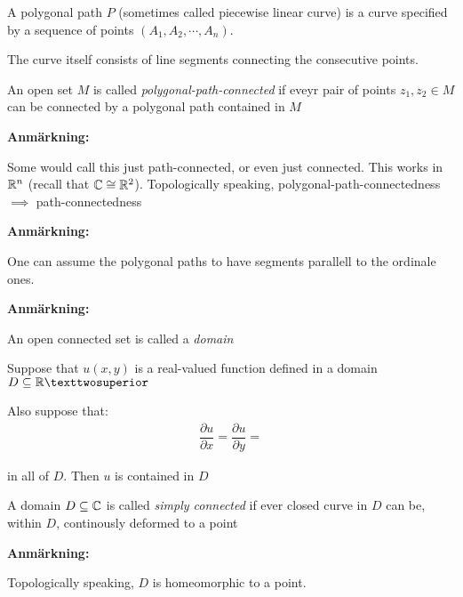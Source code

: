 \par\bigskip
\begin{theo}{}
  A polygonal path $P$ (sometimes called piecewise linear curve) is a curve specified by a sequence of points $(A_1,A_2,\cdots,A_n)$.\par
  \noindent The curve itself consists of line segments connecting the consecutive points. 
\end{theo}
\par\bigskip
\begin{theo}{}
  An open set $M$ is called \textit{polygonal-path-connected} if eveyr pair of points $z_1,z_2\in M$ can be connected by a polygonal path contained in $M$ 
\end{theo}
\par\bigskip
\noindent\textbf{Anmärkning:}\par
\noindent Some would call this just path-connected, or even just connected. This works in $\mathbb{R}^n$ (recall that $\mathbb{C}\cong\mathbb{R}^2$). Topologically speaking, polygonal-path-connectedness $\implies$ path-connectedness
\par\bigskip
\noindent\textbf{Anmärkning:}\par
\noindent One can assume the polygonal paths to have segments parallell to the ordinale ones.
\par\bigskip
\noindent\textbf{Anmärkning:}\par
\noindent An open connected set is called a \textit{domain}
\newpage
\begin{theo}[]{}
  Suppose that $u(x,y)$ is a real-valued function defined in a domain $D\subseteq\R²$\par
  \noindent Also suppose that:
  \begin{equation*}
    \begin{gathered}
      \dfrac{\partial u}{\partial x} = \dfrac{\partial u}{\partial y} = 
    \end{gathered}
  \end{equation*}
  \par\bigskip
  \noindent in all of $D$. Then $u$ is contained in $D$
\end{theo}
\par\bigskip
\begin{theo}{}
  A domain $D\subseteq\mathbb{C}$ is called \textit{simply connected} if ever closed curve in $D$ can be, within $D$, continously deformed to a point 
\end{theo}
\par\bigskip
\noindent\textbf{Anmärkning:}\par
\noindent Topologically speaking, $D$ is homeomorphic to a point. 
\newpage
